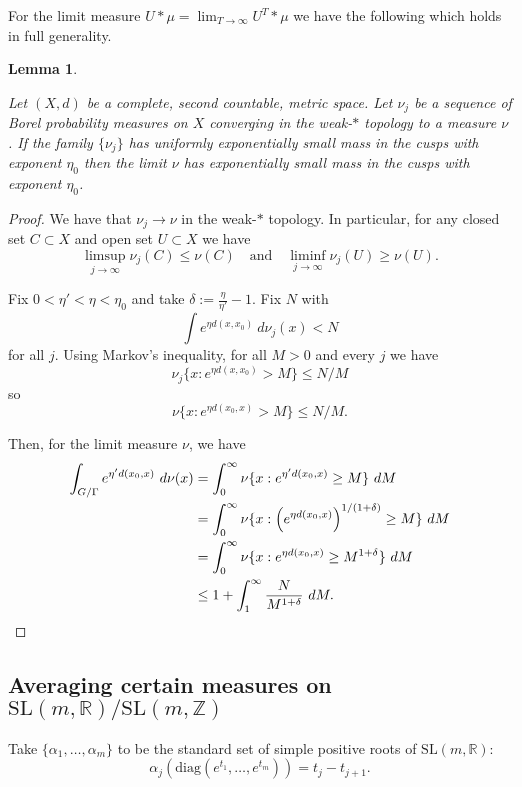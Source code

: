 \documentclass[10pt,reqno]{amsart}
\theoremstyle{Theorem}
\newtheorem{lemma}[theorem]{Lemma}
\theoremstyle{definition}
\theoremstyle{remark}
\def \diag{\mathrm{diag}}
\newcommand{\R}{\mathbb {R}}
\newcommand{\Z}{\mathbb {Z}}
\newcommand{\Sl}{\mathrm{SL}}
\begin{document}
For the limit measure $U \ast \mu= \lim_{T\to \infty} U^T\ast \mu$ we have the following which holds in full generality.
\begin{lemma}\label{lem:pastrydough}

Let $(X,d)$ be a complete,  second countable, metric space.
Let $\nu_j$ be a sequence of  Borel probability  measures on $X$ converging in the weak-$*$ topology to a measure $\nu$.   If the family
$\{ \nu_j\}$ has uniformly exponentially small mass in the cusps with exponent   $\eta_0$ then the limit $\nu$ has   exponentially small mass in the cusps with  exponent   $\eta_0$.   \end{lemma}
\begin{proof}
We have that $\nu_j\to \nu$ in the weak-$*$ topology.  In particular, for any closed set $C\subset X$ and open set  $U\subset X$ we have
$$\limsup_{j\to \infty} \nu_j (C) \le  \nu(C) \quad \text{and} \quad \liminf_{j\to \infty} \nu_j (U) \ge  \nu(U).$$

Fix $0<\eta'<\eta< \eta_0$  and take $\delta:= \frac{\eta}{\eta'}-1.  $
Fix $N$ with  $$\int e^{\eta d(x, x_0)} \ d \nu_j(x) <N$$
for all $j$.
Using Markov's inequality,  for all  $M>0$ and every $j$ we have
$$\nu_j\{ x : e^{\eta d(x,x_0)} > M\} \le  N/M $$
so $$\nu\{ x : e^{\eta d(x_0, x)} > M\} \le  N/M.$$




Then, for the limit measure $\nu$, we have
\begin{align*}
\int_{G/\Gamma} e^{\eta' d(x_0, x)} \ d \nu(x)
&=
\int_0^\infty
\nu\{ x : e^{\eta'  d(x_0, x)} \ge M\} \ d M\\
&=
\int_0^\infty
\nu\{ x : \left(e^{\eta  d(x_0, x)}\right)^{1/(1+\delta)} \ge {M}   \} \ d M\\
&= \int_0^\infty \nu\{ x : e^{\eta  d(x_0, x)} \ge {M}^{1+\delta}   \} \ d M\\
&\le 1 + \int_1^\infty  \frac{N}{{M}^{1+\delta} }  \ d M.\qedhere
\end{align*}
\end{proof}

\subsection{Averaging certain measures on $\Sl(m,\R)/\Sl(m,\Z)$}
Take  $\{\alpha_1, \dots, \alpha_m\}$ to be the standard set of simple positive roots of $\Sl(m,\R)$:
	$$\alpha_j (\diag(e^{t_1}, \dots, e^{t_m})) = t_j-t_{j+1}.$$
\end{document}
